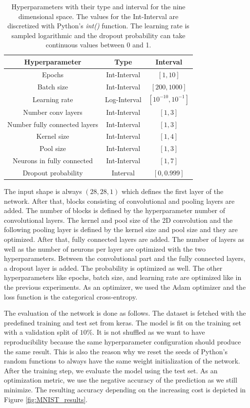 \begin{table}[H]
	\caption{ Hyperparameters with their type and interval for the nine dimensional space. The values for the Int-Interval are discretized with Python's \textit{int()} function. The learning rate is sampled logarithmic and the dropout probability can take continuous values between 0 and 1. }
	\label{tab:hyperparameter_space_mnist}
	\centering
	\begin{tabular}{| c c c |} 
		\hline
		Hyperparameter & Type & Interval \\ 
		\hline
	 	Epochs & Int-Interval & $ [1,10] $ \\ 
	 	Batch size & Int-Interval & $ [200,1000] $ \\ 
	 	Learning rate & Log-Interval & $ [10^{-10},10^{-1}] $ \\ 
	 	Number conv layers & Int-Interval & $ [1,3] $ \\ 
	 	Number fully connected layers & Int-Interval & $ [1,3] $ \\ 
	 	Kernel size & Int-Interval & $ [1,4] $ \\ 
	 	Pool size & Int-Interval & $ [1,3] $ \\ 
	 	Neurons in fully connected & Int-Interval & $ [1,7] $ \\ 
	 	Dropout probability & Interval & $ [0,0.999] $ \\ 
		\hline
	\end{tabular}
\end{table}

The input shape is always $ (28, 28, 1) $ which defines the first layer of the network. After that, blocks consisting of convolutional and pooling layers are added. The number of blocks is defined by the hyperparameter number of convolutional layers. The kernel and pool size of the 2D convolution and the following pooling layer is defined by the kernel size and pool size and they are optimized. After that, fully connected layers are added. The number of layers as well as the number of neurons per layer are optimized with the two hyperparameters. Between the convolutional part and the fully connected layers, a dropout layer is added. The probability is optimized as well. The other hyperparameters like epochs, batch size, and learning rate are optimized like in the previous experiments. As an optimizer, we used the Adam optimizer and the loss function is the categorical cross-entropy. \newline 

The evaluation of the network is done as follows. The dataset is fetched with the predefined training and test set from keras. The model is fit on the training set with a validation split of $ 10\% $. It is not shuffled as we want to have reproducibility because the same hyperparameter configuration should produce the same result. This is also the reason why we reset the seeds of Python's random functions to always have the same weight initialization of the network. After the training step, we evaluate the model using the test set. As an optimization metric, we use the negative accuracy of the prediction as we still minimize. The resulting accuracy depending on the increasing cost is depicted in Figure \ref{fig:MNIST_results}.



